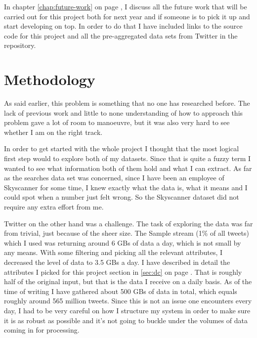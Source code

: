 \documentclass[minf,frontabs,twoside,singlespacing,parskip]{infthesis}
\begin{document}
In chapter \ref{chap:future-work} on page \pageref{chap:future-work}, I discuss all the future work that will be carried out for this project both for next year and if someone is to pick it up and start developing on top. In order to do that I have included links to the source code for this project and all the pre-aggregated data sets from Twitter in the repository.



\chapter{Methodology}
\label{chap:method}


As said earlier, this problem is something that no one has researched before. The lack of previous work and little to none understanding of how to approach this problem gave a lot of room to manoeuvre, but it was also very hard to see whether I am on the right track.


In order to get started with the whole project I thought that the most logical first step would to explore both of my datasets. Since that is quite a fuzzy term I wanted to see what information both of them hold and what I can extract. As far as the searches data set was concerned, since I have been an employee of Skyscanner for some time, I knew exactly what the data is, what it means and I could spot when a number just felt wrong. So the Skyscanner dataset did not require any extra effort from me. 


Twitter on the other hand was a challenge. The task of exploring the data was far from trivial, just because of the sheer size. The Sample stream (1\% of all tweets) which I used \cite{samplestream} was returning around 6 GBs of data a day, which is not small by any means. With some filtering and picking all the relevant attributes, I decreased the level of data to 3.5 GBs a day. I have described in detail the attributes I picked for this project section in \ref{sec:dc} on page \pageref{sec:dc}. That is roughly half of the original input, but that is the data I receive on a daily basis. As of the time of writing I have gathered about 500 GBs of data in total, which equals roughly around 565 million tweets. Since this is not an issue one encounters every day, I had to be very careful on how I structure my system in order to make sure it is as robust as possible and it's not going to buckle under the volumes of data coming in for processing. 
\end{document}
